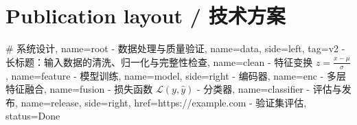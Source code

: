 \documentclass{article}
\begin{document}
\section*{Publication layout / 技术方案}
\noindent
\begin{mindchart}[layout=balanced,fit_width=\linewidth,fit_height=19cm,avoid_overlaps=true,max_width=3cm,root_style={font=\Large,fill=blue,text_color=white},branch_style={font=\normalsize,shape=card,pad_x=10},leaf_style={font=\small,shape=rect,fill=white}]
# 系统设计, name=root
  - 数据处理与质量验证, name=data, side=left, tag=v2
    - 长标题：输入数据的清洗、归一化与完整性检查, name=clean
    - 特征变换 $z=\frac{x-\mu}{\sigma}$, name=feature
  - 模型训练, name=model, side=right
    - 编码器, name=enc
      - 多层特征融合, name=fusion
        - 损失函数 $\mathcal{L}(y,\hat{y})$
    - 分类器, name=classifier
  - 评估与发布, name=release, side=right, href=https://example.com
    - 验证集评估, status=Done
\end{mindchart}
\end{document}
